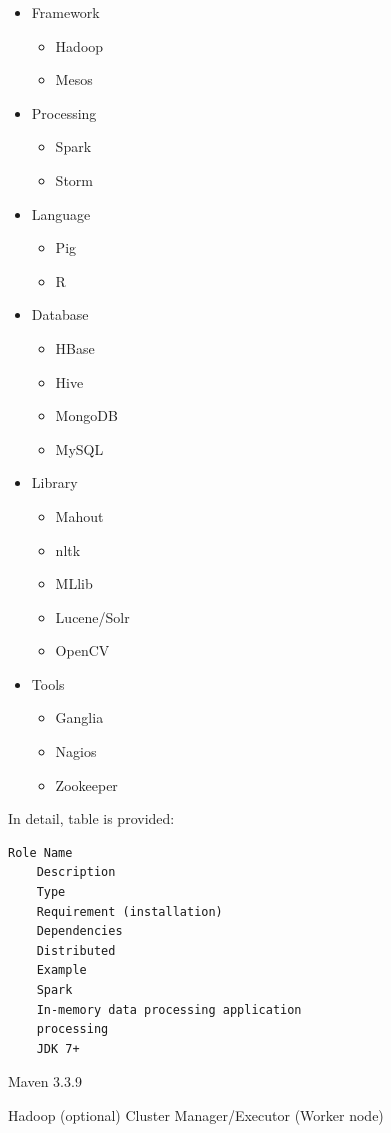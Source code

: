 \documentclass[9pt,twocolumn,twoside]{styles/osajnl}
\begin{document}
\begin{itemize}
\item Framework
\begin{itemize}
   \item Hadoop
   \item Mesos
\end{itemize}
\item Processing
\begin{itemize}
   \item Spark
   \item Storm
\end{itemize}
\item Language
\begin{itemize}
   \item Pig
   \item R
\end{itemize}
\item Database
\begin{itemize}
   \item HBase
   \item Hive
   \item MongoDB
   \item MySQL
\end{itemize}
\item Library
\begin{itemize}
   \item Mahout
   \item nltk
   \item MLlib
   \item Lucene/Solr
   \item OpenCV
\end{itemize}
\item Tools
\begin{itemize}
   \item Ganglia
   \item Nagios
   \item Zookeeper
\end{itemize}
\end{itemize}


In detail, table is provided:

\begin{verbatim}
Role Name
	Description
	Type
	Requirement (installation)
	Dependencies
	Distributed
	Example
	Spark
	In-memory data processing application
	processing
	JDK 7+
\end{verbatim}

Maven 3.3.9

	Hadoop (optional)
	Cluster Manager/Executor (Worker node)
	
\end{document}
